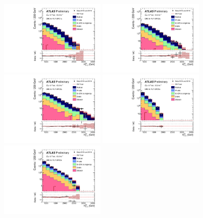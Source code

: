 \begin{figure}[tbp]
\begin{center}
\includegraphics[width=0.45\textwidth]{figures/ATLAS-CONF-2016-078_INT/N-1Plots/AtlasStyle/Preliminary/CRQ_SRJigsawSRG1a_LastCut_CRQ_minusone}
\includegraphics[width=0.45\textwidth]{figures/ATLAS-CONF-2016-078_INT/N-1Plots/AtlasStyle/Preliminary/CRQ_SRJigsawSRG2a_LastCut_CRQ_minusone}
\includegraphics[width=0.45\textwidth]{figures/ATLAS-CONF-2016-078_INT/N-1Plots/AtlasStyle/Preliminary/CRQ_SRJigsawSRG3a_LastCut_CRQ_minusone}
\includegraphics[width=0.45\textwidth]{figures/ATLAS-CONF-2016-078_INT/N-1Plots/AtlasStyle/Preliminary/CRQ_SRJigsawSRS1a_LastCut_CRQ_minusone}
\includegraphics[width=0.45\textwidth]{figures/ATLAS-CONF-2016-078_INT/N-1Plots/AtlasStyle/Preliminary/CRQ_SRJigsawSRS2a_LastCut_CRQ_minusone}

\end{center}
\end{figure}
